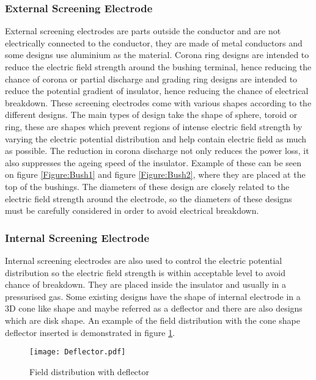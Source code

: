 
\subsubsection{External Screening Electrode}

External screening electrodes are parts outside the conductor and are not electrically connected to the conductor, they are made of metal conductors and some designs use aluminium as the material. Corona ring designs are intended to reduce the electric field strength around the bushing terminal, hence reducing the chance of corona or partial discharge and grading ring designs are intended to reduce the potential gradient of insulator, hence reducing the chance of electrical breakdown. These screening electrodes come with various shapes according to the different designs. The main types of design take the shape of sphere, toroid or ring, these are shapes which prevent regions of intense electric field strength by varying the electric potential distribution and help contain electric field as much as possible. The reduction in corona discharge not only reduces the power loss, it also suppresses the ageing speed of the insulator. Example of these can be seen on figure \ref{Figure:Bush1} and figure \ref{Figure:Bush2}, where they are placed at the top of the bushings. The diameters of these design are closely related to the electric field strength around the electrode, so the diameters of these designs must be carefully considered in order to avoid electrical breakdown.

\subsubsection{Internal Screening Electrode}

Internal screening electrodes are also used to control the electric potential distribution so the electric field strength is within acceptable level to avoid chance of breakdown. They are placed inside the insulator and usually in a pressurised gas. Some existing designs have the shape of internal electrode in a 3D cone like shape and maybe referred as a deflector and there are also designs which are disk shape. An example of the field distribution with the cone shape deflector inserted is demonstrated in figure \ref{figure:deflector}.

\begin{figure}[!h]
   \centering
   \texttt{[image: Deflector.pdf]}
   \caption{Field distribution with deflector}
   \label{figure:deflector}
\end{figure}

